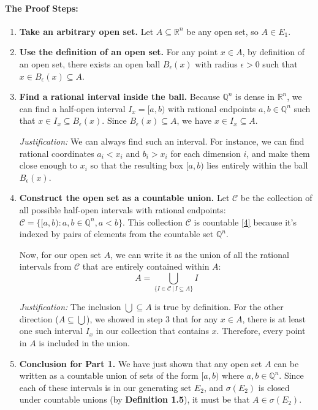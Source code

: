 \documentclass[11pt,a4paper]{article}
\theoremstyle{tutorstyle}
\begin{document}
\paragraph{The Proof Steps:}
\begin{enumerate}
    \item \textbf{Take an arbitrary open set.} Let $A \subseteq \mathbb{R}^n$ be any open set, so $A \in E_1$.

    \item \textbf{Use the definition of an open set.} For any point $x \in A$, by definition of an open set, there exists an open ball $B_\epsilon(x)$ with radius $\epsilon > 0$ such that $x \in B_\epsilon(x) \subseteq A$.

    \item \textbf{Find a rational interval inside the ball.} Because $\mathbb{Q}^n$ is dense in $\mathbb{R}^n$, we can find a half-open interval $I_x = [a, b)$ with rational endpoints $a, b \in \mathbb{Q}^n$ such that $x \in I_x \subseteq B_\epsilon(x)$. Since $B_\epsilon(x) \subseteq A$, we have $x \in I_x \subseteq A$.

    \textit{Justification:} We can always find such an interval. For instance, we can find rational coordinates $a_i < x_i$ and $b_i > x_i$ for each dimension $i$, and make them close enough to $x_i$ so that the resulting box $[a,b)$ lies entirely within the ball $B_\epsilon(x)$.

    \item \textbf{Construct the open set as a countable union.} Let $\mathcal{C}$ be the collection of all possible half-open intervals with rational endpoints: $\mathcal{C} = \{[a,b) : a,b \in \mathbb{Q}^n, a<b\}$. This collection $\mathcal{C}$ is countable \hyperlink{concept:countable}{[4]} because it's indexed by pairs of elements from the countable set $\mathbb{Q}^n$.

    Now, for our open set $A$, we can write it as the union of all the rational intervals from $\mathcal{C}$ that are entirely contained within $A$:
    \[ A = \bigcup_{\{I \in \mathcal{C} \,|\, I \subseteq A\}} I \]

    \textit{Justification:} The inclusion $\bigcup \subseteq A$ is true by definition. For the other direction ($A \subseteq \bigcup$), we showed in step 3 that for any $x \in A$, there is at least one such interval $I_x$ in our collection that contains $x$. Therefore, every point in $A$ is included in the union.

    \item \textbf{Conclusion for Part 1.} We have just shown that any open set $A$ can be written as a countable union of sets of the form $[a,b)$ where $a,b \in \mathbb{Q}^n$. Since each of these intervals is in our generating set $E_2$, and $\sigma(E_2)$ is closed under countable unions (by \textbf{Definition 1.5}), it must be that $A \in \sigma(E_2)$.
\end{enumerate}
\end{document}
